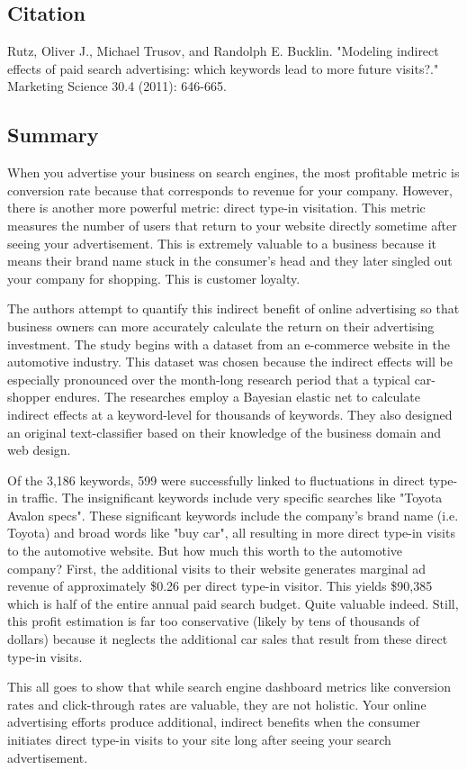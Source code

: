 \documentclass[../summaries.tex]{subfiles}
\begin{document}
\subsection{Citation}
Rutz, Oliver J., Michael Trusov, and Randolph E. Bucklin. "Modeling indirect effects of paid search advertising: which keywords lead to more future visits?." Marketing Science 30.4 (2011): 646-665.

\subsection{Summary}
When you advertise your business on search engines, the most profitable metric is conversion rate because that corresponds to revenue for your company. However, there is another more powerful metric:  direct type-in visitation. This metric measures the number of users that return to your website directly sometime after seeing your advertisement. This is extremely valuable to a business because it means their brand name stuck in the consumer's head and they later singled out your company for shopping. This is customer loyalty.

The authors attempt to quantify this indirect benefit of online advertising so that business owners can more accurately calculate the return on their advertising investment. The study begins with a dataset from an e-commerce website in the automotive industry. This dataset was chosen because the indirect effects will be especially pronounced over the month-long research period that a typical car-shopper endures. The researches employ a Bayesian elastic net to calculate indirect effects at a keyword-level for thousands of keywords. They also designed an original text-classifier based on their knowledge of the business domain and web design.

Of the 3,186 keywords, 599 were successfully linked to fluctuations in direct type-in traffic. The insignificant keywords include very specific searches like "Toyota Avalon specs". These significant keywords include the company's brand name (i.e. Toyota) and broad words like "buy car", all resulting in more direct type-in visits to the automotive website. But how much this worth to the automotive company? First, the additional visits to their website generates marginal ad revenue of approximately \$0.26 per direct type-in visitor. This yields \$90,385 which is half of the entire annual paid search budget. Quite valuable indeed. Still, this profit estimation is far too conservative (likely by tens of thousands of dollars) because it neglects the additional car sales that result from these direct type-in visits.


This all goes to show that while search engine dashboard metrics like conversion rates and click-through rates are valuable, they are not holistic. Your online advertising efforts produce additional, indirect benefits when the consumer initiates direct type-in visits to your site long after seeing your search advertisement.
\end{document}
